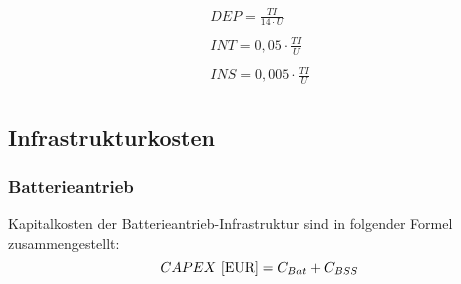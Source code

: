 %
\begin{equation}
	\begin{split}
	{DEP} = \frac{TI}{14 \cdot U} \\
\\
	{INT} = {0,05} \cdot \frac{TI}{U} \\
   \\
	{INS} = {0,005} \cdot \frac{TI}{U} \\
	\label{kapitalkosten}
 \end{split}
\end{equation}
%
\subsection{Infrastrukturkosten}
%
\subsubsection{Batterieantrieb}
Kapitalkosten der Batterieantrieb-Infrastruktur sind in folgender Formel zusammengestellt:
%
\begin{equation}
     {CAPEX ~[\text{EUR}]} = C_{Bat} + C_{BSS} \\ %
     \label{BA_Infrastruktur}
  \end{equation}

